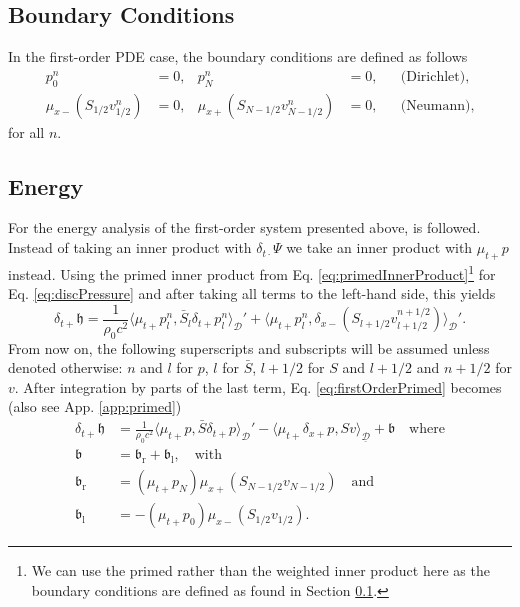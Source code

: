 \documentclass[dvipsnames]{article}
\def\dxp{\delta_{x+}}
\def\dxm{\delta_{x-}}
\def\Sbar{\bar S_l}
\begin{document}
\subsection{Boundary Conditions}\label{sec:boundariesFirstOrder}
In the first-order PDE case, the boundary conditions are defined as follows
\begin{align*}
    p_0^n &= 0, & p_N^n &= 0, & &\text{(Dirichlet),}\\
    \mu_{x-}(S_{1/2}v_{1/2}^n) &= 0, & \mu_{x+}(S_{N-1/2}v_{N-1/2}^n) &= 0, & &\text{(Neumann)},
\end{align*}
for all $n$.

\subsection{Energy}
For the energy analysis of the first-order system presented above, \cite{Harrison2018} is followed. Instead of taking an inner product with $\delta_{t\cdot}\Psi$ we take an inner product with $\mu_{t+}p$ instead. Using the primed inner product from Eq. \eqref{eq:primedInnerProduct}\footnote{We can use the primed rather than the weighted inner product here as the boundary conditions are defined as found in Section \ref{sec:boundariesFirstOrder}.} for Eq. \eqref{eq:discPressure} and after taking all terms to the left-hand side, this yields
\begin{equation}\label{eq:firstOrderPrimed}
    \delta_{t+}\mathfrak{h} = \frac{1}{\rho_0 c^2}\langle \mu_{t+}p_l^n, \Sbar \delta_{t+}p_l^n \rangle_{\mathcal{D}}' +\langle \mu_{t+}p_l^n, \dxm(S_{l+1/2}v_{l+1/2}^{n+1/2})\rangle_{\mathcal{D}}'.
\end{equation}
From now on, the following superscripts and subscripts will be assumed unless denoted otherwise: $n$ and $l$ for $p$, $l$ for $\bar S$, $l+1/2$ for $S$ and $l+1/2$ and $n+1/2$ for $v$. After integration by parts of the last term, Eq. \eqref{eq:firstOrderPrimed} becomes (also see App. \ref{app:primed})
\begin{align}\label{eq:discEnergyFirstOrder}
    \delta_{t+}\mathfrak{h} &= \frac{1}{\rho_0 c^2}\langle \mu_{t+}p, \bar S \delta_{t+}p \rangle_{\mathcal{D}}' -\langle \mu_{t+}\dxp p, Sv\rangle_{\underline{\mathcal{D}}} + \mathfrak{b} \quad \text{where}\\
    \mathfrak{b} &= \mathfrak{b}_\text{r} + \mathfrak{b}_\text{l}, \quad \text{with} \nonumber\\
    \mathfrak{b}_\text{r} &= (\mu_{t+}p_N)\mu_{x+}(S_{N-1/2}v_{N-1/2})\quad \text{and}\\
    \mathfrak{b}_\text{l} &= -(\mu_{t+}p_0)\mu_{x-}(S_{1/2}v_{1/2})\label{eq:firstOrderLeftBoundary}.
\end{align}
\end{document}
